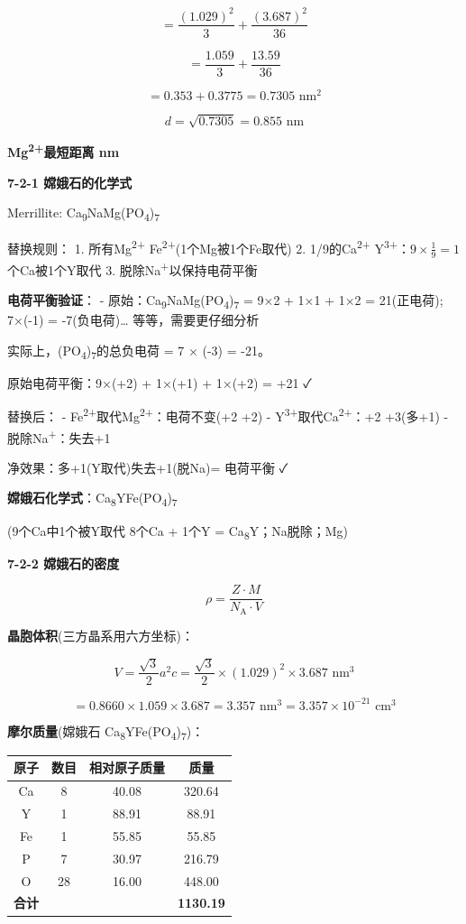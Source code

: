 \[= \frac{(1.029)^2}{3} + \frac{(3.687)^2}{36}\]

\[= \frac{1.059}{3} + \frac{13.59}{36}\]

\[= 0.353 + 0.3775 = 0.7305 \text{ nm}^2\]

\[d = \sqrt{0.7305} = 0.855 \text{ nm}\]

\textbf{Mg\textsuperscript{2+}最短距离  nm}

\textbf{7-2-1 嫦娥石的化学式}

Merrillite: Ca\textsubscript{9}NaMg(PO\textsubscript{4})\textsubscript{7}

替换规则：
1. 所有Mg\textsuperscript{2+} \箭 Fe\textsuperscript{2+}(1个Mg被1个Fe取代)
2. 1/9的Ca\textsuperscript{2+} \箭 Y\textsuperscript{3+}：\(9 \times \frac{1}{9} = 1\) 个Ca被1个Y取代
3. 脱除Na\textsuperscript{+}以保持电荷平衡

\textbf{电荷平衡验证}：
- 原始：Ca\textsubscript{9}NaMg(PO\textsubscript{4})\textsubscript{7} = 9×2 + 1×1 + 1×2 = 21(正电荷); 7×(-1) = -7(负电荷)\ldots{} 等等，需要更仔细分析

实际上，(PO\textsubscript{4})\textsubscript{7}的总负电荷 = 7 × (-3) = -21。

原始电荷平衡：9×(+2) + 1×(+1) + 1×(+2) = +21 ✓

替换后：
- Fe\textsuperscript{2+}取代Mg\textsuperscript{2+}：电荷不变(+2 \箭 +2)
- Y\textsuperscript{3+}取代Ca\textsuperscript{2+}：+2 \箭 +3(多+1)
- 脱除Na\textsuperscript{+}：失去+1

净效果：多+1(Y取代)失去+1(脱Na)= 电荷平衡 ✓

\textbf{嫦娥石化学式}：Ca\textsubscript{8}YFe(PO\textsubscript{4})\textsubscript{7}

(9个Ca中1个被Y取代 \箭 8个Ca + 1个Y = Ca\textsubscript{8}Y；Na脱除；Mg)

\textbf{7-2-2 嫦娥石的密度}

\[\rho = \frac{Z \cdot M}{N_\mathrm{A} \cdot V}\]

\textbf{晶胞体积}(三方晶系用六方坐标)：

\[V = \frac{\sqrt{3}}{2} a^2 c = \frac{\sqrt{3}}{2} \times (1.029)^2 \times 3.687 \text{ nm}^3\]

\[= 0.8660 \times 1.059 \times 3.687 = 3.357 \text{ nm}^3 = 3.357 \times 10^{-21} \text{ cm}^3\]

\textbf{摩尔质量}(嫦娥石 Ca\textsubscript{8}YFe(PO\textsubscript{4})\textsubscript{7})：

{\def\LTcaptype{none} %
\begin{longtable}[]{@{}cccc@{}}
\toprule\noalign{}
原子 & 数目 & 相对原子质量 & 质量 \\
\midrule\noalign{}
\endhead
\bottomrule\noalign{}
\endlastfoot
Ca & 8 & 40.08 & 320.64 \\
Y & 1 & 88.91 & 88.91 \\
Fe & 1 & 55.85 & 55.85 \\
P & 7 & 30.97 & 216.79 \\
O & 28 & 16.00 & 448.00 \\
\textbf{合计} & & & \textbf{1130.19} \\
\end{longtable}
}

